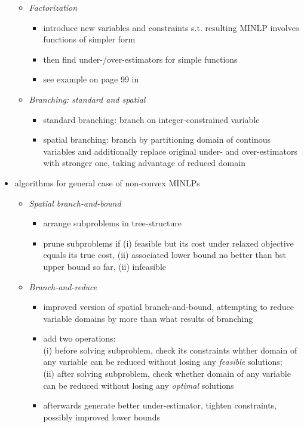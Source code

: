\documentclass{article}
\begin{document}
\begin{itemize}
\begin{itemize}
\begin{itemize}
		\end{itemize}
	\item \emph{Factorization}
		\begin{itemize}
		\item introduce new variables and constraints s.t. resulting MINLP involves functions of simpler form
		\item then find under-/over-estimators for simple functions
		\item see example on page 99 in \cite{burer2012non}
		\end{itemize}
	\item \emph{Branching: standard and spatial}
		\begin{itemize}
		\item standard branching: branch on integer-constrained variable
		\item spatial branching: branch by partitioning domain of continous variables and additionally replace original under- and over-estimators with stronger one, taking advantage of reduced domain
		\end{itemize}
	\end{itemize}
\item algorithms for general case of non-convex MINLPs
	\begin{itemize}
	\item \emph{Spatial branch-and-bound}
		\begin{itemize}
		\item arrange subproblems in tree-structure
		\item prune subproblems if (i) feasible but its cost under relaxed objective equals its true cost, (ii) associated lower bound no better than bst upper bound so far, (ii) infeasible
		\end{itemize}
	\item \emph{Branch-and-reduce}
		\begin{itemize}
		\item improved version of spatial branch-and-bound, attempting to reduce variable domains by more than what results of branching
		\item add two operations:\\ (i) before solving subproblem, check its constraints whther domain of any variable can be reduced without losing any \emph{feasible} solutions;\\ (ii) after solving subproblem, check whether domain of any variable can be reduced without losing any \emph{optimal} solutions
		\item afterwards generate better under-estimator, tighten constraints, possibly improved lower bounds

\end{itemize}
\end{itemize}
\end{itemize}
\end{document}

